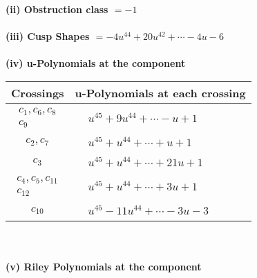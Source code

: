\documentclass[1p]{elsarticle_modified}
\theoremstyle{definition}
\begin{document}
\flushleft \textbf{(ii) Obstruction class $= -1$}\\~\\
\flushleft \textbf{(iii) Cusp Shapes $= -4 u^{44}+20 u^{42}+\cdots-4 u-6$}\\~\\
\newpage\renewcommand{\arraystretch}{1}
\flushleft \textbf{(iv) u-Polynomials at the component}\newline \\
\begin{tabular}{m{50pt}|m{274pt}}
Crossings & \hspace{64pt}u-Polynomials at each crossing \\
\hline $$\begin{aligned}c_{1},c_{6},c_{8}\\c_{9}\end{aligned}$$&$\begin{aligned}
&u^{45}+9 u^{44}+\cdots- u+1
\end{aligned}$\\
\hline $$\begin{aligned}c_{2},c_{7}\end{aligned}$$&$\begin{aligned}
&u^{45}+u^{44}+\cdots+u+1
\end{aligned}$\\
\hline $$\begin{aligned}c_{3}\end{aligned}$$&$\begin{aligned}
&u^{45}+u^{44}+\cdots+21 u+1
\end{aligned}$\\
\hline $$\begin{aligned}c_{4},c_{5},c_{11}\\c_{12}\end{aligned}$$&$\begin{aligned}
&u^{45}+u^{44}+\cdots+3 u+1
\end{aligned}$\\
\hline $$\begin{aligned}c_{10}\end{aligned}$$&$\begin{aligned}
&u^{45}-11 u^{44}+\cdots-3 u-3
\end{aligned}$\\
\hline
\end{tabular}\\~\\
\newpage\renewcommand{\arraystretch}{1}
\flushleft \textbf{(v) Riley Polynomials at the component}\newline \\
\end{document}
